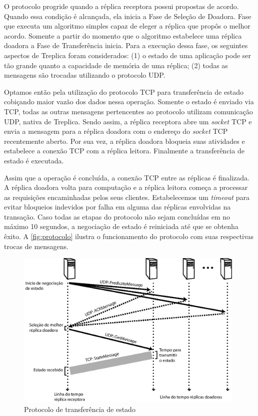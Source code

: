 O protocolo progride quando a réplica receptora possui propostas de acordo. Quando essa
condição é alcançada, ela inicia a Fase de Seleção de Doadora. Fase que executa um
algoritmo simples capaz de eleger a réplica que propôs o melhor acordo. Somente a partir
do momento que o algoritmo estabelece uma réplica doadora a Fase de Transferência inicia.
Para a execução dessa fase, os seguintes aspectos de Treplica foram considerados: (1) o
estado de uma aplicação pode ser tão grande quanto a capacidade de memória de uma réplica;
(2) todas as mensagens são trocadas utilizando o protocolo UDP.

Optamos então pela utilização do protocolo TCP para transferência de estado cobiçando
maior vazão dos dados nessa operação. Somente o estado é enviado via TCP, todas as outras
mensagens pertencentes ao protocolo utilizam comunicação UDP, nativa de Treplica. Sendo
assim, a réplica receptora abre um \emph{socket} TCP e envia a mensagem
 para a réplica doadora com o endereço do \emph{socket} TCP
recentemente aberto. Por sua vez, a réplica doadora bloqueia suas atividades e estabelece
a conexão TCP com a réplica leitora. Finalmente a transferência de estado é executada.

Assim que a operação é concluída, a conexão TCP entre as réplicas é finalizada. A réplica
doadora volta para computação e a réplica leitora começa a processar as requisições
encaminhadas pelos seus clientes. Estabelecemos um \emph{timeout} para evitar bloqueios
indevidos por falha em alguma das réplicas envolvidas na transação. Caso todas as etapas
do protocolo não sejam concluídas em no máximo 10 segundos, a negociação de estado é
reiniciada até que se obtenha êxito. A \autoref{fig:protocolo} ilustra o funcionamento do
protocolo com suas respectivas trocas de mensagens.

\begin{figure}[ht]
  \centering
  \includegraphics[width=11cm]{conteudo/capitulos/figuras/transferencia_estado.eps}
  \caption{Protocolo de transferência de estado}
  \label{fig:protocolo}
\end{figure}


